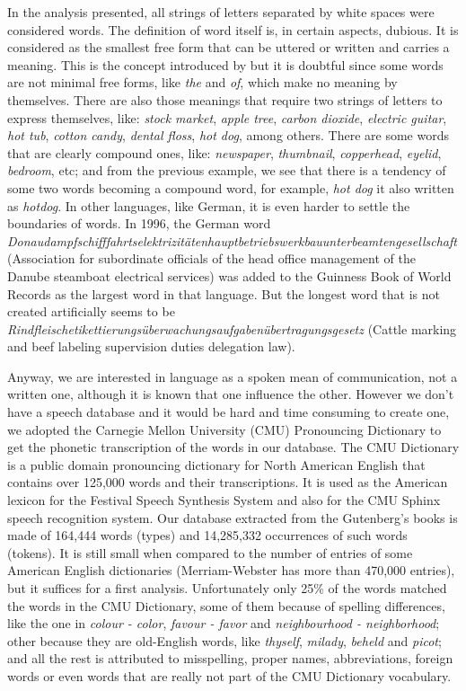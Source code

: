 In the analysis presented, all strings of letters separated by white spaces were considered words. The definition of word itself is, in certain aspects, dubious. It is considered as the smallest free form that can be uttered or written and carries a meaning. This is the concept introduced by \cite{bloomfield1926} but it is doubtful since some words are not minimal free forms, like \textit{the} and \textit{of}, which make no meaning by themselves. There are also those meanings that require two strings of letters to express themselves, like: \textit{stock market}, \textit{apple tree}, \textit{carbon dioxide}, \textit{electric guitar}, \textit{hot tub}, \textit{cotton candy}, \textit{dental floss}, \textit{hot dog}, among others. There are some words that are clearly compound ones, like: \textit{newspaper}, \textit{thumbnail}, \textit{copperhead}, \textit{eyelid}, \textit{bedroom}, etc; and from the previous example, we see that there is a tendency of some two words becoming a compound word, for example, \textit{hot dog} it also written as \textit{hotdog}. In other languages, like German, it is even harder to settle the boundaries of words. In 1996, the German word \textit{Donaudampf\-schifffahrt\-selektrizitäten\-haupt\-betriebs\-werkbau\-unter\-beamten\-gesellschaft} (Association for subordinate officials of the head office management of the Danube steamboat electrical services) was added to the Guinness Book of World Records as the largest word in that language. But the longest word that is not created artificially seems to be \textit{Rindfleische\-tikettierungs\-über\-wachungs\-aufgaben\-über\-tragungs\-gesetz} (Cattle marking and beef labeling supervision duties delegation law).

Anyway, we are interested in language as a spoken mean of communication, not a written one, 
although it is known that one influence the other. %
However we don't have a speech database and it would be hard and time consuming to create one, 
we adopted the Carnegie Mellon University (CMU) Pronouncing Dictionary to get the phonetic transcription 
of the words in our database. The CMU Dictionary is a public domain pronouncing dictionary for 
North American English that contains over 125,000 words and their transcriptions. 
It is used as the American lexicon for the Festival Speech Synthesis System and also for 
the CMU Sphinx speech recognition system. Our database extracted from the Gutenberg's books is 
made of 164,444 words (types) and 14,285,332 occurrences of such words (tokens). 
It is still small when compared to the number of entries of some American English dictionaries 
(Merriam-Webster has more than 470,000 entries), but it suffices for a first analysis. 
Unfortunately only 25\% of the words matched the words in the CMU Dictionary, 
some of them because of spelling differences, like the one in \textit{colour - color}, 
\textit{favour - favor} and \textit{neighbourhood - neighborhood}; 
other because they are old-English words, like \textit{thyself}, \textit{milady}, 
\textit{beheld} and \textit{picot}; and all the rest is attributed to misspelling, 
proper names, abbreviations, foreign words or even words that are really not part of 
the CMU Dictionary vocabulary.

